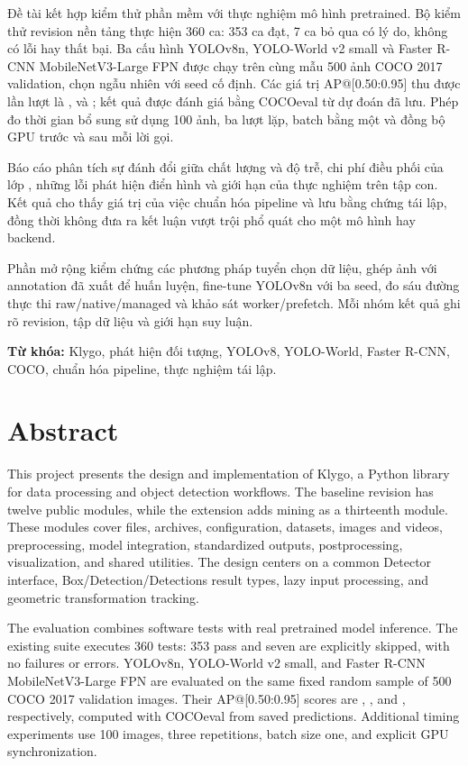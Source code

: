 Đề tài kết hợp kiểm thử phần mềm với thực nghiệm mô hình pretrained. Bộ kiểm thử revision nền tảng thực hiện 360 ca: 353 ca đạt, 7 ca bỏ qua có lý do, không có lỗi hay thất bại. Ba cấu hình YOLOv8n, YOLO-World v2 small và Faster R-CNN MobileNetV3-Large FPN được chạy trên cùng mẫu 500 ảnh COCO 2017 validation, chọn ngẫu nhiên với seed cố định. Các giá trị AP@[0.50:0.95] thu được lần lượt là \APYolo, \APWorld{} và \APFaster; kết quả được đánh giá bằng COCOeval từ dự đoán đã lưu. Phép đo thời gian bổ sung sử dụng 100 ảnh, ba lượt lặp, batch bằng một và đồng bộ GPU trước và sau mỗi lời gọi.

Báo cáo phân tích sự đánh đổi giữa chất lượng và độ trễ, chi phí điều phối của lớp , những lỗi phát hiện điển hình và giới hạn của thực nghiệm trên tập con. Kết quả cho thấy giá trị của việc chuẩn hóa pipeline và lưu bằng chứng tái lập, đồng thời không đưa ra kết luận vượt trội phổ quát cho một mô hình hay backend.

Phần mở rộng kiểm chứng các phương pháp tuyển chọn dữ liệu, ghép ảnh với annotation đã xuất để huấn luyện, fine-tune YOLOv8n với ba seed, đo sáu đường thực thi raw/native/managed và khảo sát worker/prefetch. Mỗi nhóm kết quả ghi rõ revision, tập dữ liệu và giới hạn suy luận.

\textbf{Từ khóa:} Klygo, phát hiện đối tượng, YOLOv8, YOLO-World, Faster R-CNN, COCO, chuẩn hóa pipeline, thực nghiệm tái lập.
\clearpage

\chapter*{Abstract}
This project presents the design and implementation of Klygo, a Python library for data processing and object detection workflows. The baseline revision has twelve public modules, while the extension adds mining as a thirteenth module. These modules cover files, archives, configuration, datasets, images and videos, preprocessing, model integration, standardized outputs, postprocessing, visualization, and shared utilities. The design centers on a common Detector interface, Box/Detection/Detections result types, lazy input processing, and geometric transformation tracking.

The evaluation combines software tests with real pretrained model inference. The existing suite executes 360 tests: 353 pass and seven are explicitly skipped, with no failures or errors. YOLOv8n, YOLO-World v2 small, and Faster R-CNN MobileNetV3-Large FPN are evaluated on the same fixed random sample of 500 COCO 2017 validation images. Their AP@[0.50:0.95] scores are \APYoloEN, \APWorldEN, and \APFasterEN, respectively, computed with COCOeval from saved predictions. Additional timing experiments use 100 images, three repetitions, batch size one, and explicit GPU synchronization.

